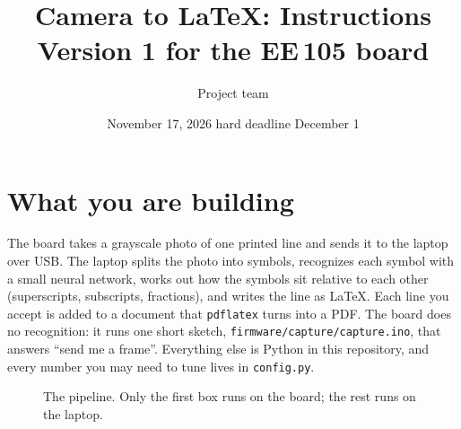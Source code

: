 \documentclass[11pt]{article}
\title{Camera to \LaTeX: Instructions\\[2pt]\large Version 1 for the EE\,105 board}
\author{Project team}
\date{November 17, 2026 \textperiodcentered{} hard deadline December 1}
\newcommand{\cmd}[1]{\texttt{#1}}
\begin{document}
\maketitle

\section{What you are building}

The board takes a grayscale photo of one printed line and sends it to the laptop over USB. The
laptop splits the photo into symbols, recognizes each symbol with a small neural network, works
out how the symbols sit relative to each other (superscripts, subscripts, fractions), and writes
the line as \LaTeX. Each line you accept is added to a document that \cmd{pdflatex} turns into a
PDF. The board does no recognition: it runs one short sketch, \cmd{firmware/capture/capture.ino},
that answers ``send me a frame''. Everything else is Python in this repository, and every number
you may need to tune lives in \cmd{config.py}.

\begin{figure}[H]
\centering
{}
\caption{The pipeline. Only the first box runs on the board; the rest runs on the laptop.}
\end{figure}
\end{document}
